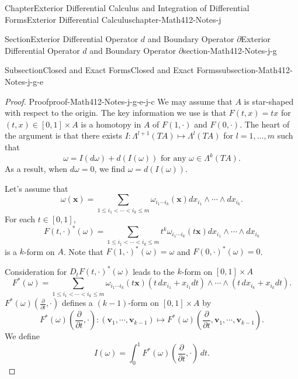 \documentclass[oneside,10pt,]{book}
\numberwithin{equation}{section}
\newcommand{\bv}{\mathbf{v}}
\newcommand{\bx}{\mathbf{x}}
\begin{document}
\begin{chapterptx}{Chapter}{Exterior Differential Calculus and Integration of Differential Forms}{}{Exterior Differential Calculus}{}{}{chapter-Math412-Notes-j}
\begin{sectionptx}{Section}{Exterior Differential Operator \(d\) and Boundary Operator \(\partial\)}{}{Exterior Differential Operator \(d\) and Boundary Operator \(\partial\)}{}{}{section-Math412-Notes-j-g}
\begin{subsectionptx}{Subsection}{Closed and Exact Forms}{}{Closed and Exact Forms}{}{}{subsection-Math412-Notes-j-g-e}
\begin{proof}{Proof}{}{proof-Math412-Notes-j-g-e-j-c}
We may assume that \(A\) is star-shaped with respect to the origin. The key information we use is that \(F(t, x)=tx\) for \((t, x)\in [0, 1]\times A\) is a homotopy in \(A\) of \(F(1, \cdot)\) and \(F(0, \cdot)\). The heart of the argument is that there exists \(I: \Lambda^{l+1}(TA)\mapsto \Lambda^{l}(TA)\) for \(l=1, \ldots, m\) such that%
\begin{equation}
\omega = I(d\omega) + d\left(I(\omega)\right) \text{ for any } \omega \in \Lambda^{k}(TA).\label{men-homotopy}
\end{equation}
As a result, when \(d\omega=0\), we find \(\omega=d\left(I(\omega)\right)\).%
\par
Let's assume that%
\begin{equation*}
\omega(\bx)=\sum_{1\le i_{1} < \cdots < i_{k}\le m} \omega_{i_{1}\cdots i_{k}}(\bx) 
dx_{i_{1}}\wedge\cdots \wedge dx_{i_{k}}.
\end{equation*}
For each \(t\in [0, 1]\),%
\begin{equation*}
F(t, \cdot)^{*}(\omega)= \sum_{1\le i_{1} < \cdots < i_{k}\le m} t^{k}\omega_{i_{1}\cdots i_{k}}(t\bx) 
dx_{i_{1}}\wedge\cdots \wedge dx_{i_{k}}
\end{equation*}
is a \(k\)-form on \(A\).  Note that \(F(1, \cdot)^{*}(\omega)=\omega\) and \(F(0, \cdot)^{*}(\omega)=0\).%
\par
Consideration for \(D_{t} F(t, \cdot)^{*}(\omega)\) leads to the \(k\)-form on \([0, 1]\times A\)%
\begin{equation*}
F^{*}(\omega)= \sum_{1\le i_{1} < \cdots < i_{k}\le m} \omega_{i_{1}\cdots i_{k}}(t\bx) 
\left(t\,dx_{i_{1}}+ x_{i_{1}} dt\right)\wedge\cdots \wedge \left(t \, dx_{i_{k}}+ x_{i_{k}}dt\right).
\end{equation*}
\(F^{*}(\omega)(\frac{\partial }{\partial t}, \cdot)\) defines a \((k-1)\)-form on \([0, 1]\times A\) by%
\begin{equation*}
F^{*}(\omega)(\frac{\partial }{\partial t}, \cdot): (\bv_{1},\cdots, \bv_{k-1})\mapsto F^{*}(\omega)(\frac{\partial }{\partial t}, \bv_{1},\cdots, \bv_{k-1}).
\end{equation*}
We define%
\begin{equation*}
I(\omega) = \int_{0}^{1}F^{*}(\omega)(\frac{\partial }{\partial t}, \cdot)\, dt.
\end{equation*}

\end{proof}
\end{subsectionptx}
\end{sectionptx}
\end{chapterptx}
\end{document}
